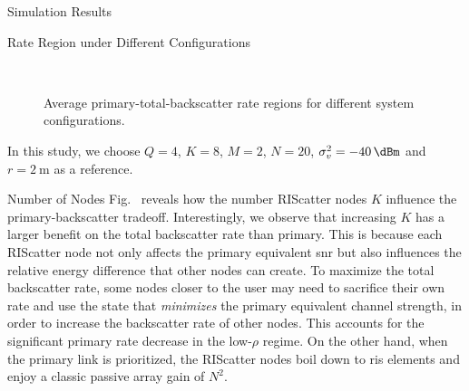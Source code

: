 \documentclass[journal,12pt,onecolumn,draftclsnofoot]{IEEEtran}
\theoremstyle{remark}
\begin{document}
\begin{section}{Simulation Results}
	\begin{subsection}{Rate Region under Different Configurations}
		\begin{figure}[!t]
			\centering
			\\
			\caption{
				Average primary-total-backscatter rate regions for different system configurations.
			}
			\label{fg:region_config}
		\end{figure}
		In this study, we choose $Q=4$, $K=8$, $M=2$, $N=20$, $\sigma_v^2=\qty{-40}{\dBm}$ and $r=\qty{2}{\meter}$ as a reference.
		\begin{subsubsection}{Number of Nodes}
			Fig.~ reveals how the number RIScatter nodes $K$ influence the primary-backscatter tradeoff.
			Interestingly, we observe that increasing $K$ has a larger benefit on the total backscatter rate than primary.
			This is because each RIScatter node not only affects the primary equivalent \gls{snr} but also influences the relative energy difference that other nodes can create.
			To maximize the total backscatter rate, some nodes closer to the user may need to sacrifice their own rate and use the state that \emph{minimizes} the primary equivalent channel strength, in order to increase the backscatter rate of other nodes.
			This accounts for the significant primary rate decrease in the low-$\rho$ regime.
			On the other hand, when the primary link is prioritized, the RIScatter nodes boil down to \gls{ris} elements and enjoy a classic passive array gain of $N^2$.
		\end{subsubsection}


\end{subsection}
\end{section}
\end{document}
